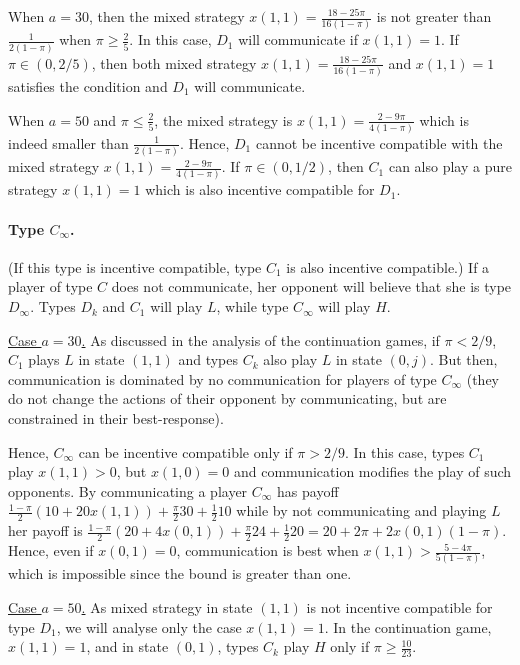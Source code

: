 \documentclass[12pt]{article}
\theoremstyle{definition}
\theoremstyle{remark}
\begin{document}
When $a=30$, then the mixed strategy $x(1,1)=\frac{18-25\pi}{16(1-\pi)}$ is not greater than $\frac{1}{2(1-\pi)}$ when $\pi\geq \frac{2}{5}$. In this case, $D_1$ will communicate if $x(1,1)=1$. If $\pi\in(0,2/5)$, then both mixed strategy $x(1,1)=\frac{18-25\pi}{16(1-\pi)}$ and $x(1,1)=1$ satisfies the condition and $D_1$ will communicate.

When $a=50$ and $\pi\leq \frac{2}{5}$, the mixed strategy is $x(1,1)=\frac{2-9\pi}{4(1-\pi)}$ which is indeed smaller than $\frac{1}{2(1-\pi)}$. Hence, $D_1$ cannot be incentive compatible with the mixed strategy $x(1,1)=\frac{2-9\pi}{4(1-\pi)}$. If $\pi\in(0, 1/2)$, then $C_1$ can also play a pure strategy $x(1,1)=1$ which is also incentive compatible for $D_1$.

\paragraph{Type $C_\infty$.}  (If this type is incentive compatible, type $C_1$ is also incentive compatible.) If a player of type $C$ does not communicate, her opponent will believe that she is type $D_\infty$. Types $D_k$ and $C_1$ will play $L$, while type $C_\infty$ will play $H$. 

\underline{Case $a=30$.}
As discussed in the analysis of the continuation games, if $\pi<2/9$, $C_1$ plays $L$ in state $(1,1)$ and types $C_k$ also play $L$ in state $(0,j)$. But then, communication is dominated by no communication for players of type $C_\infty$ (they do not change the actions of their opponent by communicating, but are constrained in their best-response).

Hence, $C_\infty$ can be incentive compatible only if $\pi>2/9$. In this case, types $C_1$ play $x(1,1)>0$, but $x(1,0)=0$ and communication modifies the play of such opponents. By communicating a player $C_\infty$ has payoff $\frac{1-\pi}{2}(10+20 x(1,1))+\frac{\pi}{2}30+\frac{1}{2}10$ while by not communicating and playing $L$ her payoff is $\frac{1-\pi}{2}(20+4x(0,1))+\frac{\pi}{2}24+\frac{1}{2}20=20+2\pi + 2 x(0,1)(1-\pi)$. Hence, even if $x(0,1)=0$, communication is best when $x(1,1)>\frac{5-4\pi}{5(1-\pi)}$, which is impossible since the bound is greater than one.

\underline{Case $a=50$.} As mixed strategy in state $(1,1)$ is not incentive compatible for type $D_1$, we will analyse only the case $x(1,1)=1$. In the continuation game, $x(1,1)=1$, and in state $(0,1)$, types $C_k$ play $H$ only if $\pi\geq \frac{10}{23}$. 
\end{document}
